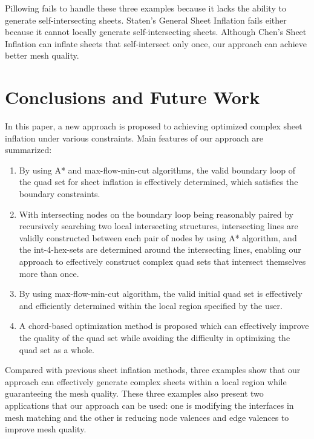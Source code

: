 \documentclass[final,5p,times,twocolumn]{elsarticle}
\begin{document}
Pillowing fails to handle these three examples because it lacks the ability to generate self-intersecting sheets. Staten's General Sheet Inflation fails either because it cannot locally generate self-intersecting sheets. Although Chen's Sheet Inflation can inflate sheets that self-intersect only once, our approach can achieve better mesh quality. 

\section{Conclusions and Future Work}
In this paper, a new approach is proposed to achieving optimized complex sheet inflation under various constraints. Main features of our approach are summarized:

\begin{enumerate}
  \item By using A* and max-flow-min-cut algorithms, the valid boundary loop of the quad set for sheet inflation is effectively determined, which satisfies the boundary constraints.
  \item With intersecting nodes on the boundary loop being reasonably paired by recursively searching two local intersecting structures, intersecting lines are validly constructed between each pair of nodes by using A* algorithm, and the int-4-hex-sets are determined around the intersecting lines, enabling our approach to effectively construct complex quad sets that intersect themselves more than once.
  \item By using max-flow-min-cut algorithm, the valid initial quad set is effectively and efficiently determined within the local region specified by the user.
  \item A chord-based optimization method is proposed which can effectively improve the quality of the quad set while avoiding the difficulty in optimizing the quad set as a whole.
\end{enumerate}

Compared with previous sheet inflation methods, three examples show that our approach can effectively generate complex sheets within a local region while guaranteeing the mesh quality. These three examples also present two applications that our approach can be used: one is modifying the interfaces in mesh matching and the other is reducing node valences and edge valences to improve mesh quality.
\end{document}
